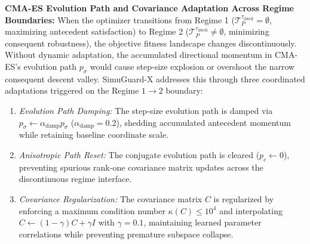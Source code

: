 \documentclass[journal]{IEEEtran}
\begin{document}
\noindent\textbf{CMA-ES Evolution Path and Covariance Adaptation Across Regime Boundaries:}
When the optimizer transitions from Regime 1 ($\mathcal{T}_P^{\tau_{\text{dwell}}} = \emptyset$, maximizing antecedent satisfaction) to Regime 2 ($\mathcal{T}_P^{\tau_{\text{dwell}}} \neq \emptyset$, minimizing consequent robustness), the objective fitness landscape changes discontinuously. Without dynamic adaptation, the accumulated directional momentum in CMA-ES's evolution path $p_\sigma$ would cause step-size explosion or overshoot the narrow consequent descent valley. SimuGuard-X addresses this through three coordinated adaptations triggered on the Regime $1 \to 2$ boundary:
\begin{enumerate}
    \item \textit{Evolution Path Damping:} The step-size evolution path is damped via $p_\sigma \leftarrow \alpha_{\text{damp}} p_\sigma$ ($\alpha_{\text{damp}} = 0.2$), shedding accumulated antecedent momentum while retaining baseline coordinate scale.
    \item \textit{Anisotropic Path Reset:} The conjugate evolution path is cleared ($p_c \leftarrow 0$), preventing spurious rank-one covariance matrix updates across the discontinuous regime interface.
    \item \textit{Covariance Regularization:} The covariance matrix $C$ is regularized by enforcing a maximum condition number $\kappa(C) \le 10^4$ and interpolating $C \leftarrow (1 - \gamma) C + \gamma I$ with $\gamma = 0.1$, maintaining learned parameter correlations while preventing premature subspace collapse.
\end{enumerate}
\end{document}
